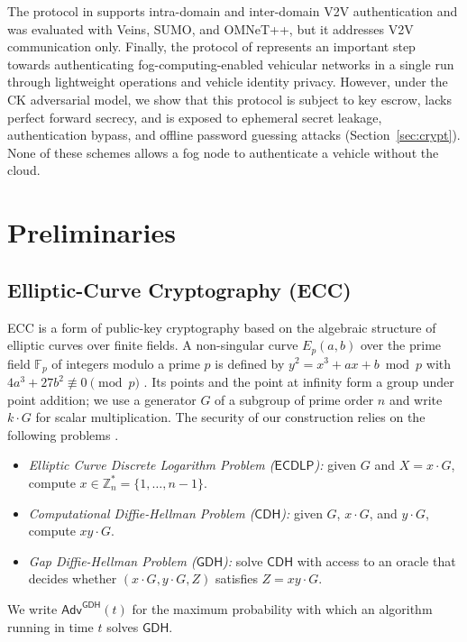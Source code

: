 \documentclass[journal]{IEEEtran}
\theoremstyle{plain}
\theoremstyle{definition}
\newcommand{\GDH}{\mathsf{GDH}}
\newcommand{\CDH}{\mathsf{CDH}}
\newcommand{\ECDLP}{\mathsf{ECDLP}}
\begin{document}
The protocol in \cite{tian2025provable} supports intra-domain and inter-domain V2V authentication and was evaluated with Veins, SUMO, and OMNeT++, but it addresses V2V communication only. Finally, the protocol of \cite{chen2024provably} represents an important step towards authenticating fog-computing-enabled vehicular networks in a single run through lightweight operations and vehicle identity privacy. However, under the CK adversarial model, we show that this protocol is subject to key escrow, lacks perfect forward secrecy, and is exposed to ephemeral secret leakage, authentication bypass, and offline password guessing attacks (Section~\ref{sec:crypt}). None of these schemes allows a fog node to authenticate a vehicle without the cloud.

\section{Preliminaries}\label{sec:prelim}

\subsection{Elliptic-Curve Cryptography (ECC)}
ECC is a form of public-key cryptography based on the algebraic structure of elliptic curves over finite fields. A non-singular curve $E_p(a,b)$ over the prime field $\mathbb{F}_p$ of integers modulo a prime $p$ is defined by $y^2 = x^3 + ax + b \bmod p$ with $4a^3+27b^2 \not\equiv 0 \pmod p$ \cite{adeniyi2024systematic}. Its points and the point at infinity form a group under point addition; we use a generator $G$ of a subgroup of prime order $n$ and write $k\cdot G$ for scalar multiplication. The security of our construction relies on the following problems \cite{ullah2023elliptic}.
\begin{itemize}
    \item \emph{Elliptic Curve Discrete Logarithm Problem ($\ECDLP$):} given $G$ and $X = x\cdot G$, compute $x\in\mathbb{Z}_n^*=\{1,\dots,n-1\}$.
    \item \emph{Computational Diffie-Hellman Problem ($\CDH$):} given $G$, $x\cdot G$, and $y\cdot G$, compute $xy\cdot G$.
    \item \emph{Gap Diffie-Hellman Problem ($\GDH$):} solve $\CDH$ with access to an oracle that decides whether $(x\cdot G, y\cdot G, Z)$ satisfies $Z = xy\cdot G$.
\end{itemize}
We write $\mathsf{Adv}^{\GDH}(t)$ for the maximum probability with which an algorithm running in time $t$ solves $\GDH$.
\end{document}
